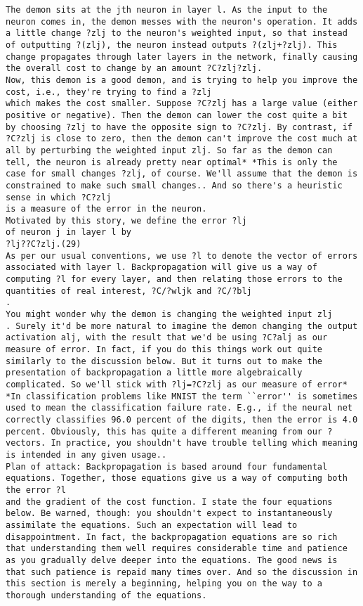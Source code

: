 \begin{lstlisting}
The demon sits at the jth neuron in layer l. As the input to the neuron comes in, the demon messes with the neuron's operation. It adds a little change ?zlj to the neuron's weighted input, so that instead of outputting ?(zlj), the neuron instead outputs ?(zlj+?zlj). This change propagates through later layers in the network, finally causing the overall cost to change by an amount ?C?zlj?zlj.
Now, this demon is a good demon, and is trying to help you improve the cost, i.e., they're trying to find a ?zlj
which makes the cost smaller. Suppose ?C?zlj has a large value (either positive or negative). Then the demon can lower the cost quite a bit by choosing ?zlj to have the opposite sign to ?C?zlj. By contrast, if ?C?zlj is close to zero, then the demon can't improve the cost much at all by perturbing the weighted input zlj. So far as the demon can tell, the neuron is already pretty near optimal* *This is only the case for small changes ?zlj, of course. We'll assume that the demon is constrained to make such small changes.. And so there's a heuristic sense in which ?C?zlj
is a measure of the error in the neuron.
Motivated by this story, we define the error ?lj
of neuron j in layer l by 
?lj??C?zlj.(29)
As per our usual conventions, we use ?l to denote the vector of errors associated with layer l. Backpropagation will give us a way of computing ?l for every layer, and then relating those errors to the quantities of real interest, ?C/?wljk and ?C/?blj
.
You might wonder why the demon is changing the weighted input zlj
. Surely it'd be more natural to imagine the demon changing the output activation alj, with the result that we'd be using ?C?alj as our measure of error. In fact, if you do this things work out quite similarly to the discussion below. But it turns out to make the presentation of backpropagation a little more algebraically complicated. So we'll stick with ?lj=?C?zlj as our measure of error* *In classification problems like MNIST the term ``error'' is sometimes used to mean the classification failure rate. E.g., if the neural net correctly classifies 96.0 percent of the digits, then the error is 4.0 percent. Obviously, this has quite a different meaning from our ?
vectors. In practice, you shouldn't have trouble telling which meaning is intended in any given usage..
Plan of attack: Backpropagation is based around four fundamental equations. Together, those equations give us a way of computing both the error ?l
and the gradient of the cost function. I state the four equations below. Be warned, though: you shouldn't expect to instantaneously assimilate the equations. Such an expectation will lead to disappointment. In fact, the backpropagation equations are so rich that understanding them well requires considerable time and patience as you gradually delve deeper into the equations. The good news is that such patience is repaid many times over. And so the discussion in this section is merely a beginning, helping you on the way to a thorough understanding of the equations.

\end{lstlisting}
